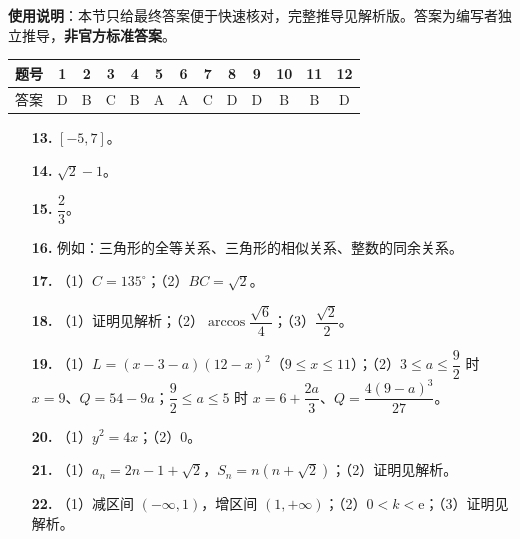 
\begin{gknotice}
\textbf{使用说明}：本节只给最终答案便于快速核对，完整推导见解析版。答案为编写者独立推导，\textbf{非官方标准答案}。
\end{gknotice}

\begin{center}\begin{tabular}{ccccccccccccc}
\toprule
题号 & 1 & 2 & 3 & 4 & 5 & 6 & 7 & 8 & 9 & 10 & 11 & 12 \\
\midrule
答案 & D & B & C & B & A & A & C & D & D & B & B & D \\
\bottomrule
\end{tabular}\end{center}

\begin{itemize}[leftmargin=2.6em]
  \item[\textbf{13.}] $[-5,7]$。
  \item[\textbf{14.}] $\sqrt2-1$。
  \item[\textbf{15.}] $\dfrac23$。
  \item[\textbf{16.}] 例如：三角形的全等关系、三角形的相似关系、整数的同余关系。
\end{itemize}

\begin{itemize}[leftmargin=2.6em]
  \item[\textbf{17.}] （1）$C=135^\circ$；（2）$BC=\sqrt2$。
  \item[\textbf{18.}] （1）证明见解析；（2）$\arccos\dfrac{\sqrt6}4$；（3）$\dfrac{\sqrt2}2$。
  \item[\textbf{19.}] （1）$L=(x-3-a)(12-x)^2$（$9\leqslant x\leqslant11$）；（2）$3\leqslant a\leqslant\dfrac92$ 时 $x=9$、$Q=54-9a$；$\dfrac92\leqslant a\leqslant5$ 时 $x=6+\dfrac{2a}3$、$Q=\dfrac{4(9-a)^3}{27}$。
  \item[\textbf{20.}] （1）$y^2=4x$；（2）$0$。
  \item[\textbf{21.}] （1）$a_n=2n-1+\sqrt2$，$S_n=n(n+\sqrt2)$；（2）证明见解析。
  \item[\textbf{22.}] （1）减区间 $(-\infty,1)$，增区间 $(1,+\infty)$；（2）$0<k<\mathrm e$；（3）证明见解析。
\end{itemize}
